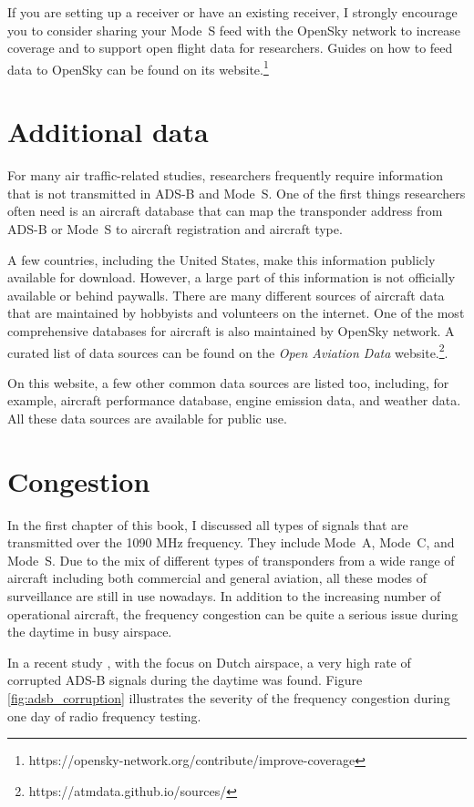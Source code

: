 If you are setting up a receiver or have an existing receiver, I strongly encourage you to consider sharing your Mode~S feed with the OpenSky network to increase coverage and to support open flight data for researchers. Guides on how to feed data to OpenSky can be found on its website.\footnote{https://opensky-network.org/contribute/improve-coverage}

\section{Additional data}

For many air traffic-related studies, researchers frequently require information that is not transmitted in ADS-B and Mode~S. One of the first things researchers often need is an aircraft database that can map the transponder address from ADS-B or Mode~S to aircraft registration and aircraft type. 

A few countries, including the United States, make this information publicly available for download. However, a large part of this information is not officially available or behind paywalls. There are many different sources of aircraft data that are maintained by hobbyists and volunteers on the internet. One of the most comprehensive databases for aircraft is also maintained by OpenSky network. A curated list of data sources can be found on the \emph{Open Aviation Data} website.\footnote{https://atmdata.github.io/sources/}.

On this website, a few other common data sources are listed too, including, for example, aircraft performance database, engine emission data, and weather data. All these data sources are available for public use.


\section{Congestion}
In the first chapter of this book, I discussed all types of signals that are transmitted over the 1090 MHz frequency. They include Mode~A, Mode~C, and Mode~S. Due to the mix of different types of transponders from a wide range of aircraft including both commercial and general aviation, all these modes of surveillance are still in use nowadays. In addition to the increasing number of operational aircraft, the frequency congestion can be quite a serious issue during the daytime in busy airspace. 

In a recent study \cite{sun2020rf}, with the focus on Dutch airspace, a very high rate of corrupted ADS-B signals during the daytime was found. Figure \ref{fig:adsb_corruption} illustrates the severity of the frequency congestion during one day of radio frequency testing.

